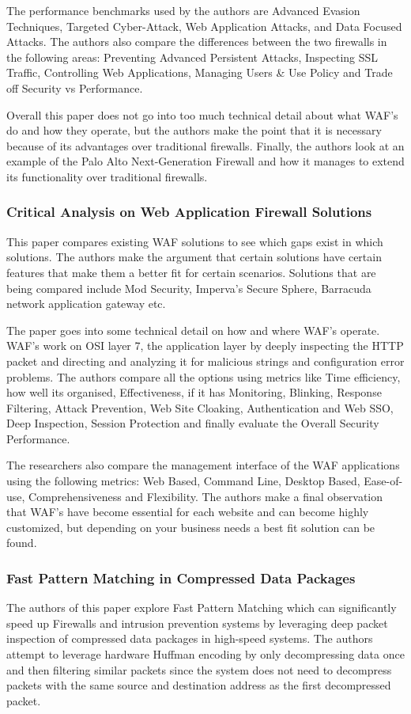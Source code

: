     The performance benchmarks used by the authors are Advanced Evasion Techniques, Targeted Cyber-Attack, Web Application Attacks, and Data Focused Attacks. The authors also compare the differences between the two firewalls in the following areas: Preventing Advanced Persistent Attacks, Inspecting SSL Traffic, Controlling Web Applications, Managing Users \& Use Policy and Trade off Security vs Performance.
    
    Overall this paper does not go into too much technical detail about what WAF's do and how they operate, but the authors make the point that it is necessary because of its advantages over traditional firewalls. Finally, the authors look at an example of the Palo Alto Next-Generation Firewall and how it manages to extend its functionality over traditional firewalls.

\subsubsection{Critical Analysis on Web Application Firewall Solutions \cite{6513431}}
    This paper compares existing WAF solutions to see which gaps exist in which solutions. The authors make the argument that certain solutions have certain features that make them a better fit for certain scenarios. Solutions that are being compared include Mod Security, Imperva's Secure Sphere, Barracuda network application gateway etc. 

    The paper goes into some technical detail on how and where WAF's operate. WAF's work on OSI layer 7, the application layer by deeply inspecting the HTTP packet and directing and analyzing it for malicious strings and configuration error problems. The authors compare all the options using metrics like Time efficiency, how well its organised, Effectiveness, if it has Monitoring, Blinking, Response Filtering, Attack Prevention, Web Site Cloaking, Authentication and Web SSO, Deep Inspection, Session Protection and finally evaluate the Overall Security Performance.

    The researchers also compare the management interface of the WAF applications using the following metrics: Web Based, Command Line, Desktop Based, Ease-of-use, Comprehensiveness and Flexibility. The authors make a final observation that WAF's have become essential for each website and can become highly customized, but depending on your business needs a best fit solution can be found.

\subsubsection{Fast Pattern Matching in Compressed Data Packages \cite{5700208}}
The authors of this paper explore Fast Pattern Matching which can significantly speed up Firewalls and intrusion prevention systems by leveraging deep packet inspection of compressed data packages in high-speed systems. The authors attempt to leverage hardware Huffman encoding by only decompressing data once and then filtering similar packets since the system does not need to decompress packets with the same source and destination address as the first decompressed packet.

